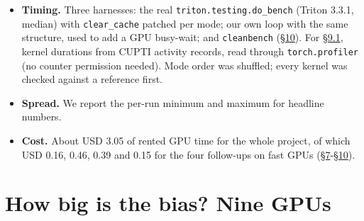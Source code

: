 \documentclass[11pt,a4paper]{article}
\providecommand{\tightlist}{\setlength{\itemsep}{0pt}\setlength{\parskip}{0pt}}
\begin{document}
\begin{itemize}
  \begin{itemize}
  \tightlist
  \item
    Timing: rented docker containers on vast.ai (nine GPUs; then an A100-SXM4-40GB, an RTX 5090, an L40S, an RTX 4060
    and an H100 NVL on new hosts for \hyperref[pitfall-2-queue-drain]{\S{}7}-\hyperref[cleanbench]{\S{}10}), with unlocked clocks.
  \item
    Per-kernel check (\hyperref[kernel-by-kernel-does-a-single-kernel-benchmark-match-the-same-kernel-inside-the-decode-proxy]{\S{}9.1}): the laptop GPU, with and without an SM clock lock at 1,000~MHz (\texttt{nvidia-smi\ -lgc}), and
    rented RTX 4060 and A100-SXM4 hosts, which refused clock locking.
  \item
    Counters: an RTX 3060 Laptop GPU (GA106, L2 3~MiB) with Nsight Compute 2024.2.1, \texttt{-\/-cache-control\ none},
    \texttt{-\/-replay-mode\ app-range}, one range per timed call with a synchronization before and after; plus rented
    VMs for the dirty-cap table. Container hosts did not allow counter access.
  \end{itemize}
\item
  \textbf{Timing.} Three harnesses: the real \texttt{triton.testing.do\_\allowbreak{}bench} (Triton 3.3.1, median) with \texttt{clear\_\allowbreak{}cache}
  patched per mode; our own loop with the same structure, used to add a GPU busy-wait; and \texttt{cleanbench} (\hyperref[cleanbench]{\S{}10}). For
  \hyperref[kernel-by-kernel-does-a-single-kernel-benchmark-match-the-same-kernel-inside-the-decode-proxy]{\S{}9.1}, kernel durations from CUPTI activity records, read through \texttt{torch.profiler} (no counter permission needed).
  Mode order was shuffled; every kernel was checked against a reference first.
\item
  \textbf{Spread.} We report the per-run minimum and maximum for headline numbers.
\item
  \textbf{Cost.} About USD 3.05 of rented GPU time for the whole project, of which USD 0.16, 0.46, 0.39 and 0.15 for the
  four follow-ups on fast GPUs (\hyperref[pitfall-2-queue-drain]{\S{}7}-\hyperref[cleanbench]{\S{}10}).
\end{itemize}

\section{How big is the bias? Nine GPUs}\label{how-big-is-the-bias-nine-gpus}
\end{document}
